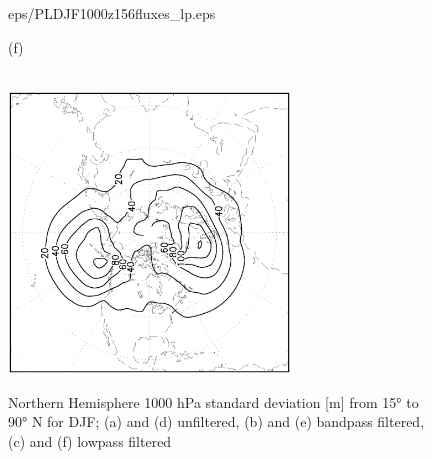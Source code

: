 \documentclass[12pt,a4paper,twoside,openright,headinclude,liststotoc,bibtotoc]{scrreprt}
\begin{document}
\begin{appendix}
\begin{figure}[b]
{{eps/PLDJF1000z156fluxes_lp.eps}
}
\parbox{8.5cm}{\hspace{0.95cm}\begin{scriptsize}(f)\end{scriptsize} \vspace{-0.2cm} \\
\includegraphics[height=7.5cm,angle=-90]
{eps/ERA40_Z1000DJF_fluxes_lp.eps}
}
\caption[Northern Hemisphere 1000 hPa standard deviation]{Northern Hemisphere 1000 hPa standard deviation [m] from 15° to 90° N for DJF; (a) and (d) unfiltered, (b) and (e) bandpass filtered, (c) and (f) lowpass filtered}
\label{img:z1000DJF}
\end{figure}




\end{appendix}
\end{document}
